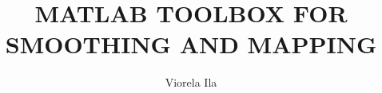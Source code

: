 \documentclass{article}
\begin{document}
\pagestyle{empty}
\title{\textbf{MATLAB TOOLBOX FOR SMOOTHING AND MAPPING}}
\author{Viorela Ila}



\maketitle

\pagestyle{fancy}
\fancyhf{}
\lhead[]{\thepage}
\rhead[\thepage]{}
\doublespacing



\end{document}
